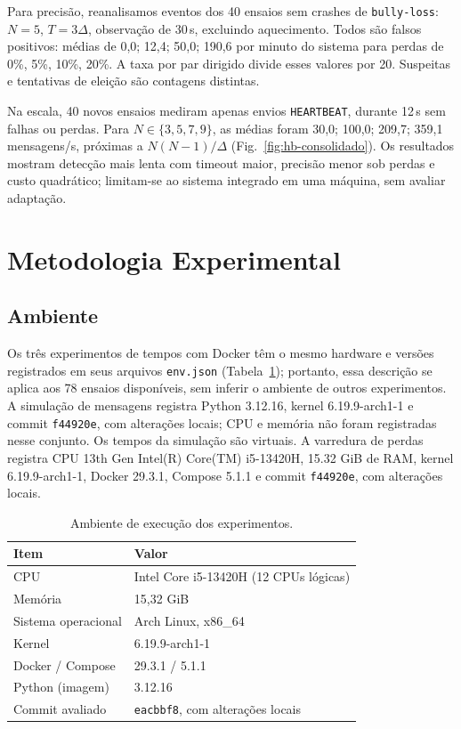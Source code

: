 \documentclass[conference]{IEEEtran}
\newcommand{\evento}[1]{\texttt{\detokenize{#1}}} %
\begin{document}
Para precisão, reanalisamos eventos \evento{suspect} dos 40 ensaios sem crashes de \texttt{bully-loss}: $N=5$, $T=3\Delta$, observação de 30\,s, excluindo aquecimento. Todos são falsos positivos: médias de 0,0; 12,4; 50,0; 190,6 por minuto do sistema para perdas de 0\%, 5\%, 10\%, 20\%. A taxa por par dirigido divide esses valores por 20. Suspeitas e tentativas de eleição são contagens distintas.

Na escala, 40 novos ensaios mediram apenas envios \texttt{HEARTBEAT}, durante 12\,s sem falhas ou perdas. Para $N\in\{3,5,7,9\}$, as médias foram 30,0; 100,0; 209,7; 359,1 mensagens/s, próximas a $N(N-1)/\Delta$ (Fig.~\ref{fig:hb-consolidado}). Os resultados mostram detecção mais lenta com timeout maior, precisão menor sob perdas e custo quadrático; limitam-se ao sistema integrado em uma máquina, sem avaliar adaptação.

\section{Metodologia Experimental}
\label{sec:metodologia}

\subsection{Ambiente}
\label{sec:ambiente}

Os três experimentos de tempos com Docker têm o mesmo hardware e versões registrados em seus arquivos \texttt{env.json} (Tabela~\ref{tab:ambiente}); portanto, essa descrição se aplica aos 78 ensaios disponíveis, sem inferir o ambiente de outros experimentos. A simulação de mensagens registra Python 3.12.16, kernel 6.19.9-arch1-1 e commit \texttt{f44920e}, com alterações locais; CPU e memória não foram registradas nesse conjunto. Os tempos da simulação são virtuais. A varredura de perdas registra CPU 13th Gen Intel(R) Core(TM) i5-13420H, 15.32 GiB de RAM, kernel 6.19.9-arch1-1, Docker 29.3.1, Compose 5.1.1 e commit \texttt{f44920e}, com alterações locais.

\begin{table}[t]
\centering
\caption{Ambiente de execução dos experimentos.}
\label{tab:ambiente}
\footnotesize
\begin{tabular}{ll}
\toprule
\textbf{Item} & \textbf{Valor} \\
\midrule
CPU                    & Intel Core i5-13420H (12 CPUs lógicas) \\
Memória                & 15,32 GiB \\
Sistema operacional    & Arch Linux, x86\_64 \\
Kernel                 & 6.19.9-arch1-1 \\
Docker / Compose       & 29.3.1 / 5.1.1 \\
Python (imagem)        & 3.12.16 \\
Commit avaliado        & \texttt{eacbbf8}, com alterações locais \\
\bottomrule
\end{tabular}
\end{table}
\end{document}
